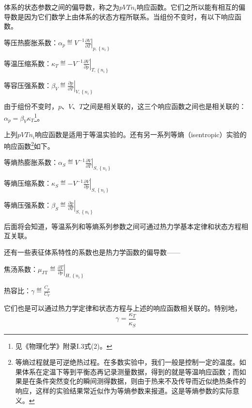 \documentclass[main.tex]{subfiles}
\begin{document}
体系的状态参数之间的偏导数，称之为$pVTn_i$响应函数。它们之所以能有相互的偏导数是因为它们数学上由体系的状态方程所联系。当组份不变时，有以下响应函数。

等压热膨胀系数：$\alpha_p\eqdef V^{-1}\left.\frac{\partial V}{\partial T}\right|_{p,\left\{n_i\right\}}$

等温压缩系数：$\kappa_T\eqdef-V^{-1}\left.\frac{\partial V}{\partial p}\right|_{T,\left\{n_i\right\}}$

等容压强系数：$\beta_V\eqdef\left.\frac{\partial p}{\partial T}\right|_{V,\left\{n_i\right\}}$

由于组份不变时，$p$、$V$、$T$之间是相关联的，这三个响应函数之间也是相关联的：$\alpha_p=\beta_V\kappa_T$\footnote{见《物理化学》附录I.3式(2)。}。

上列$pVTn_i$响应函数是适用于等温实验的。还有另一系列等熵（isentropic）实验的响应函数\footnote{等熵过程就是可逆绝热过程。在多数实验中，我们一般是控制一定的温度。如果体系在定温下等到平衡态再记录测量数据，得到的就是等温响应函数；而如果是在条件突然变化的瞬间测得数据，则由于热来不及传导而近似绝热条件的响应，这样的实验结果常近似作为等熵参数来报道。这是等熵参数的实际意义。}如下。

等熵热膨胀系数：$\alpha_S\eqdef V^{-1}\left.\frac{\partial V}{\partial T}\right|_{S,\left\{n_i\right\}}$

等熵压缩系数：$\kappa_S\eqdef -V^{-1}\left.\frac{\partial V}{\partial p}\right|_{S,\left\{n_i\right\}}$

等熵压强系数：$\beta_S\eqdef\left.\frac{\partial p}{\partial T}\right|_{S,\left\{n_i\right\}}$

后面将会知道，等温系列和等熵系列参数之间可通过热力学基本定律和状态方程相互关联。

还有一些表征体系特性的系数也是热力学函数的偏导数——

焦汤系数：$\mu_\text{JT}\eqdef\left.\frac{\partial T}{\partial p}\right|_{H,\left\{n_i\right\}}$

热容比：$\gamma\eqdef\frac{C_p}{C_V}$

它们也是可以通过热力学定律和状态方程与上述的响应函数相关联的。特别地，
\begin{equation*}
    \gamma=\frac{\kappa_T}{\kappa_S}
\end{equation*}
\end{document}
